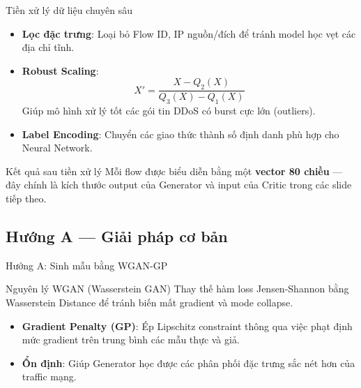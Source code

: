 \documentclass[aspectratio=169,11pt]{beamer}
\begin{document}
\begin{frame}{Tiền xử lý dữ liệu chuyên sâu}
  \begin{itemize}\setlength\itemsep{6pt}
    \item \textbf{Lọc đặc trưng}: Loại bỏ Flow ID, IP nguồn/đích để
          tránh model học vẹt các địa chỉ tĩnh.
    \item \textbf{Robust Scaling}:
      \[ X' = \frac{X - Q_2(X)}{Q_3(X) - Q_1(X)} \]
      Giúp mô hình xử lý tốt các gói tin DDoS có burst cực lớn (outliers).
    \item \textbf{Label Encoding}: Chuyển các giao thức thành số định danh
          phù hợp cho Neural Network.
  \end{itemize}
  \vspace{6pt}
  \begin{exampleblock}{Kết quả sau tiền xử lý}
    \small
    Mỗi flow được biểu diễn bằng một \textbf{vector 80 chiều} ---
    đây chính là kích thước output của Generator và input của Critic
    trong các slide tiếp theo.
  \end{exampleblock}
\end{frame}

\subsection{Hướng A --- Giải pháp cơ bản}

\begin{frame}{Hướng A: Sinh mẫu bằng WGAN-GP}
  \begin{block}{Nguyên lý WGAN (Wasserstein GAN)}
    Thay thế hàm loss Jensen-Shannon bằng Wasserstein Distance để tránh
    biến mất gradient và mode collapse.
  \end{block}
  \vspace{10pt}
  \begin{itemize}
    \item \textbf{Gradient Penalty (GP)}: Ép Lipschitz constraint thông
          qua việc phạt định mức gradient trên trung bình các mẫu thực
          và giả.
    \item \textbf{Ổn định}: Giúp Generator học được các phân phối đặc
          trưng sắc nét hơn của traffic mạng.
  \end{itemize}
\end{frame}
\end{document}
